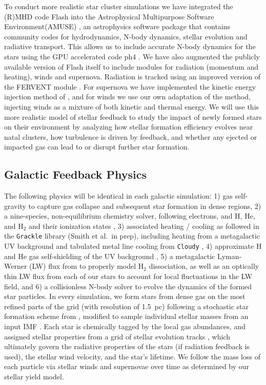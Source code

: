 \documentclass[11pt]{article}
\begin{document}
To conduct more realistic star cluster simulations we have integrated the (R)MHD code Flash into the Astrophysical Multipurpose Software Environment(AMUSE) \citep{AMUSE}, an astrophysics software package that contains community codes for hydrodynamics, N-body dynamics, stellar evolution and radiative transport. This allows us to include accurate N-body dynamics for the stars using the GPU accelerated code ph4 \citep{ph4}. We have also augmented the publicly available version of Flash itself to include modules for radiation (momentum and heating), winds and supernova. Radiation is tracked using an improved version of the FERVENT module \citep{baczynski_fervent:_2015}. For supernova we have implemented the kinetic energy injection method of \citet{Simpson2015}, and for winds we use our own adaptation of the \cite{Simpson2015} method, injecting winds as a mixture of both kinetic and thermal energy. We will use this more realistic model of stellar feedback to study the impact of newly formed stars on their environment by analyzing how stellar formation efficiency evolves near natal clusters, how turbulence is driven by feedback, and whether any ejected or impacted gas can lead to or disrupt further star formation. 

\subsection{Galactic Feedback Physics}

The following physics will be identical in each galactic simulation: 1) gas self-gravity to capture gas collapse and subsequent star formation in dense regions, 2) a nine-species, non-equilibrium chemistry solver, following electrons, and H, He, and H$_{2}$ and their ionization states \citep{Anninos1997, Abel1997}, 3) associated heating / cooling as followed in the \texttt{Grackle} library (Smith et al.\ in prep), including heating from a metagalactic UV background \citep{HM2012} and tabulated metal line cooling from \texttt{Cloudy} \citep{Cloudy2013}, 4) approximate H and He gas self-shielding of the UV background \citep{Rahmati2013}, 5) a metagalactic Lyman-Werner (LW) flux from \cite{HM2012} to properly model H$_{2}$ dissociation, as well as an optically thin LW flux from each of our stars to account for local fluctuations in the LW field, and 6) a collisionless N-body solver to evolve the dynamics of the formed star particles. In every simulation, we form stars from dense gas on the most refined parts of the grid (with resolution of 1.5~pc) following a stochastic star formation scheme from \cite{Goldbaum2015, Goldbaum2016}, modified to sample individual stellar masses from an input IMF \citep[e.g.][]{Salpeter1955}. Each star is chemically tagged by the local gas abundances, and assigned stellar properties from a grid of stellar evolution tracks \citep{Bressan2012}, which ultimately govern the radiative properties of the stars (if radiation feedback is used), the stellar wind velocity, and the star's lifetime. We follow the mass loss of each particle via stellar winds and supernovae over time as determined by our stellar yield model.
\end{document}
